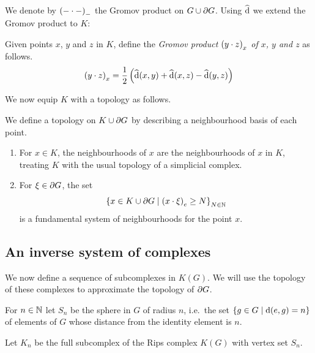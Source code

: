\documentclass[a4paper]{article}
\begin{document}
We denote by $\gromov{{-}}{{-}}{{-}}$ the Gromov product on $G \union
\boundary G$. Using $\newdist$ we extend the Gromov product to $K$:

\begin{definition}
  Given points $x$, $y$ and $z$ in $K$, define the \emph{Gromov product
  $\gromov{x}{y}{z}$ of $x$, $y$ and $z$} as follows.
  \begin{align*}
    \gromov{x}{y}{z} = \frac{1}{2}\left(\newdist(x,y) + \newdist(x,z) -
          \newdist(y,z)\right)
  \end{align*}
\end{definition}

We now equip $K$ with a topology as follows.

\begin{definition}
  We define a topology on $K \union \boundary G$ by describing a neighbourhood
  basis of each point.
  \begin{enumerate}
    \item For $x \in K$, the neighbourhoods of $x$ are the neighbourhoods of
      $x$ in $K$, treating $K$ with the usual topology of a simplicial complex.
    \item For $\xi \in \boundary G$, the set
      \begin{align*}
        \set{x \in K \union \boundary G \suchthat \gromov{e}{x}{\xi} \geq N}_{N\in\naturals}
      \end{align*}
      is a fundamental system of neighbourhoods for the point $x$.
  \end{enumerate}
\end{definition}

\subsection{An inverse system of complexes}

We now define a sequence of subcomplexes in $K(G)$. We will use the topology of
these complexes to approximate the topology of $\boundary G$. 

\begin{definition}
  For $n \in \naturals$ let $S_n$ be the sphere in $G$ of radius $n$, i.e.\ the 
  set $\set{g \in G \suchthat \dist(e, g) = n}$ of elements of $G$ whose 
  distance from the identity element is $n$. 

  Let $K_n$ be the full subcomplex of the Rips complex $K(G)$ with vertex set
  $S_n$.
\end{definition}
\end{document}
